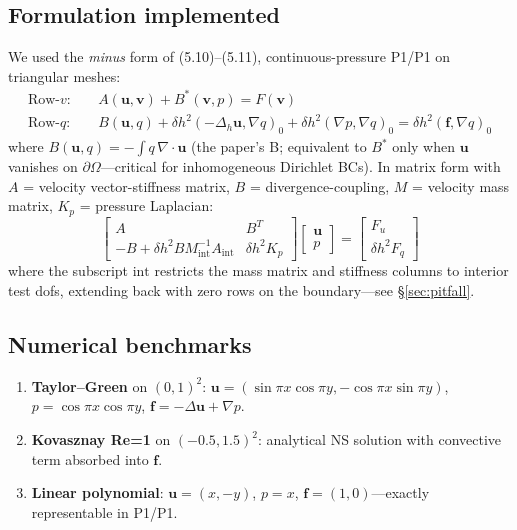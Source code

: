 \documentclass[11pt]{article}
\begin{document}
\subsection{Formulation implemented}
We used the \emph{minus} form of (5.10)--(5.11), continuous-pressure P1/P1 on triangular meshes:
\begin{align*}
\text{Row-}v: \quad & A(\mathbf{u}, \mathbf{v}) + B^*(\mathbf{v}, p) = F(\mathbf{v}) \\
\text{Row-}q: \quad & B(\mathbf{u}, q) + \delta h^2 (-\Delta_h \mathbf{u}, \nabla q)_0 + \delta h^2 (\nabla p, \nabla q)_0 = \delta h^2 (\mathbf{f}, \nabla q)_0
\end{align*}
where $B(\mathbf{u}, q) = -\int q\, \nabla \cdot \mathbf{u}$ (the paper's B; equivalent to $B^*$ only when $\mathbf{u}$ vanishes on $\partial \Omega$---critical for inhomogeneous Dirichlet BCs). In matrix form with $A$ = velocity vector-stiffness matrix, $B$ = divergence-coupling, $M$ = velocity mass matrix, $K_p$ = pressure Laplacian:
\[
\begin{bmatrix} A & B^T \\ -B + \delta h^2 B M^{-1}_{\text{int}} A_{\text{int}} & \delta h^2 K_p \end{bmatrix}
\begin{bmatrix} \mathbf{u} \\ p \end{bmatrix}
=
\begin{bmatrix} F_u \\ \delta h^2 F_q \end{bmatrix}
\]
where the subscript $\text{int}$ restricts the mass matrix and stiffness columns to interior test dofs, extending back with zero rows on the boundary---see \S\ref{sec:pitfall}.

\subsection{Numerical benchmarks}
\begin{enumerate}
    \item \textbf{Taylor--Green} on $(0,1)^2$: $\mathbf{u} = (\sin\pi x \cos\pi y, -\cos\pi x \sin\pi y)$, $p = \cos\pi x \cos\pi y$, $\mathbf{f} = -\Delta \mathbf{u} + \nabla p$.
    \item \textbf{Kovasznay Re=1} on $(-0.5, 1.5)^2$: analytical NS solution with convective term absorbed into $\mathbf{f}$.
    \item \textbf{Linear polynomial}: $\mathbf{u} = (x, -y)$, $p = x$, $\mathbf{f} = (1, 0)$---exactly representable in P1/P1.
\end{enumerate}
\end{document}
